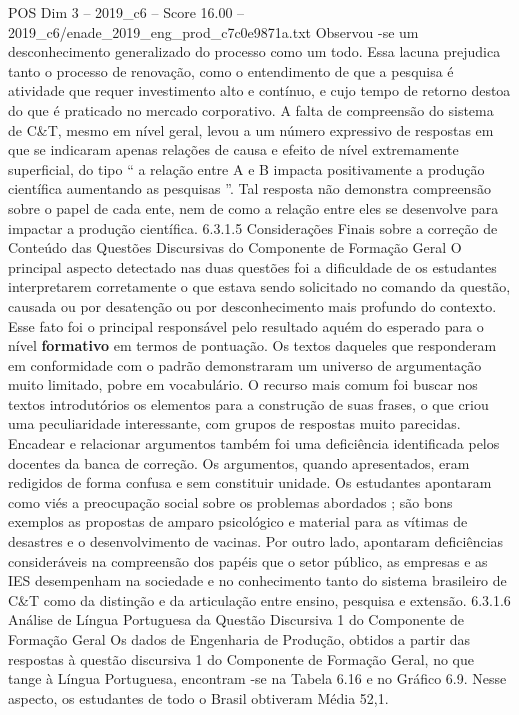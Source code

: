 \begin{textsample}{POS Dim 3 – 2019\_c6 – Score 16.00 – 2019\_c6/enade\_2019\_eng\_prod\_c7c0e9871a.txt}
Observou -se um desconhecimento generalizado do processo como um todo.
Essa lacuna prejudica tanto o processo de renovação, como o entendimento de que a pesquisa é atividade que requer investimento alto e contínuo, e cujo tempo de retorno destoa do que é praticado no mercado corporativo.
A falta de compreensão do sistema de C\&T, mesmo em nível geral, levou a um número expressivo de respostas em que se indicaram apenas relações de causa e efeito de nível extremamente superficial, do tipo “ a relação entre A e B impacta positivamente a produção científica aumentando as pesquisas ”.
Tal resposta não demonstra compreensão sobre o papel de cada ente, nem de como a relação entre eles se desenvolve para impactar a produção científica. 6.3.1.5 Considerações Finais sobre a correção de Conteúdo das Questões Discursivas do Componente de Formação Geral O principal aspecto detectado nas duas questões foi a dificuldade de os estudantes interpretarem corretamente o que estava sendo solicitado no comando da questão, causada ou por desatenção ou por desconhecimento mais profundo do contexto.
Esse fato foi o principal responsável pelo resultado aquém do esperado para o nível \textbf{formativo} em termos de pontuação.
Os textos daqueles que responderam em conformidade com o padrão demonstraram um universo de argumentação muito limitado, pobre em vocabulário.
O recurso mais comum foi buscar nos textos introdutórios os elementos para a construção de suas frases, o que criou uma peculiaridade interessante, com grupos de respostas muito parecidas.
Encadear e relacionar argumentos também foi uma deficiência identificada pelos docentes da banca de correção.
Os argumentos, quando apresentados, eram redigidos de forma confusa e sem constituir unidade.
Os estudantes apontaram como viés a preocupação social sobre os problemas abordados ; são bons exemplos as propostas de amparo psicológico e material para as vítimas de desastres e o desenvolvimento de vacinas.
Por outro lado, apontaram deficiências consideráveis na compreensão dos papéis que o setor público, as empresas e as IES desempenham na sociedade e no conhecimento tanto do sistema brasileiro de C\&T como da distinção e da articulação entre ensino, pesquisa e extensão. 6.3.1.6 Análise de Língua Portuguesa da Questão Discursiva 1 do Componente de Formação Geral Os dados de Engenharia de Produção, obtidos a partir das respostas à questão discursiva 1 do Componente de Formação Geral, no que tange à Língua Portuguesa, encontram -se na Tabela 6.16 e no Gráfico 6.9.
Nesse aspecto, os estudantes de todo o Brasil obtiveram Média 52,1.

\end{textsample}
